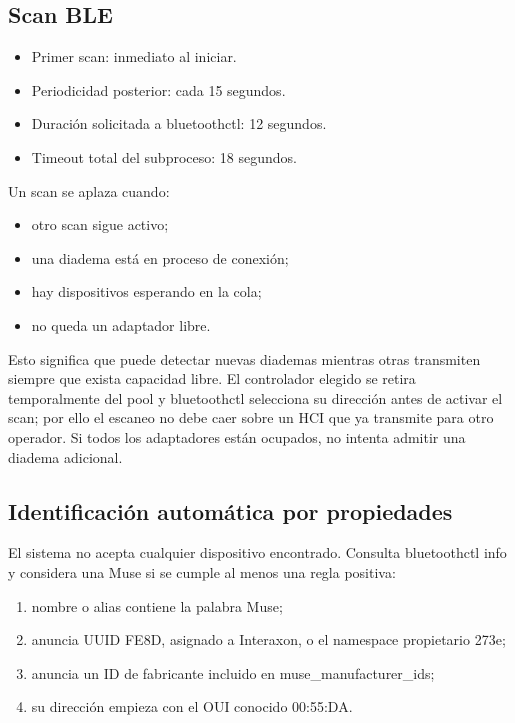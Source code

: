 \documentclass[11pt,a4paper]{article}
\begin{document}
\subsection{Scan BLE}

\begin{itemize}
\item Primer scan: inmediato al iniciar.
\item Periodicidad posterior: cada 15 segundos.
\item Duración solicitada a {\ttfamily\small bluetoothctl}: 12 segundos.
\item Timeout total del subproceso: 18 segundos.
\end{itemize}

Un scan se aplaza cuando:

\begin{itemize}
\item otro scan sigue activo;
\item una diadema está en proceso de conexión;
\item hay dispositivos esperando en la cola;
\item no queda un adaptador libre.
\end{itemize}

Esto significa que puede detectar nuevas diademas mientras otras transmiten siempre que
exista capacidad libre. El controlador elegido se retira temporalmente del pool y
{\ttfamily\small bluetoothctl} selecciona su dirección antes de activar el scan; por ello
el escaneo no debe caer sobre un HCI que ya transmite para otro operador. Si todos los
adaptadores están ocupados, no intenta admitir una diadema adicional.

\subsection{Identificación automática por propiedades}

El sistema no acepta cualquier dispositivo encontrado. Consulta {\ttfamily\small bluetoothctl info} y considera una Muse si se cumple al menos una regla positiva:

\begin{enumerate}
\item nombre o alias contiene la palabra Muse;
\item anuncia UUID {\ttfamily\small FE8D}, asignado a Interaxon, o el namespace propietario {\ttfamily\small 273e};
\item anuncia un ID de fabricante incluido en {\ttfamily\small muse\_manufacturer\_ids};
\item su dirección empieza con el OUI conocido {\ttfamily\small 00:55:DA}.
\end{enumerate}
\end{document}
